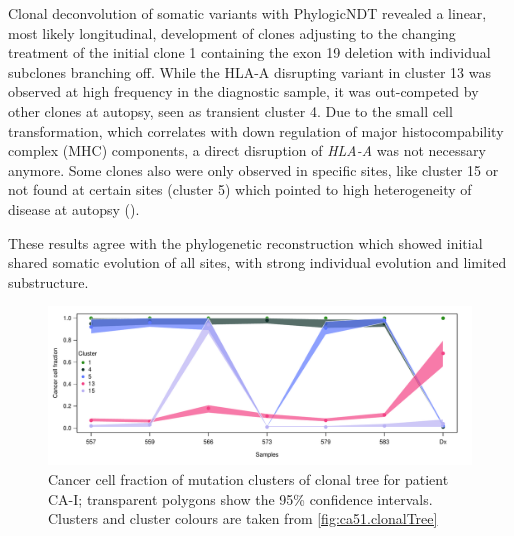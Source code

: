 Clonal deconvolution of somatic variants with PhylogicNDT revealed a linear, most likely longitudinal, development of clones adjusting to the changing treatment of the initial clone 1 containing the exon 19 deletion with individual subclones branching off. While the HLA-A disrupting variant in cluster 13 was observed at high frequency in the diagnostic sample, it was out-competed by other clones at autopsy, seen as transient cluster 4. Due to the small cell transformation, which correlates with down regulation of major histocompability complex (MHC) components, a direct disruption of \textit{HLA-A} was not necessary anymore. Some clones also were only observed in specific sites, like cluster 15 or not found at certain sites (cluster 5) which pointed to high heterogeneity of disease at autopsy ().

These results agree with the phylogenetic reconstruction which showed initial shared somatic evolution of all sites, with strong individual evolution and limited substructure.

\begin{figure}[ht]
\centering
\includegraphics[width=.99\linewidth]{Figures/CASCADE/CA51/CA51.ccf_cluster.pdf}
\caption[Cancer cell fraction of mutation clusters of clonal tree for patient CA-I]{Cancer cell fraction of mutation clusters of clonal tree for patient CA-I; transparent polygons show the 95\% confidence intervals. Clusters and cluster colours are taken from \protect\autoref{fig:ca51.clonalTree}} \label{fig:ca51.ccfCluster}
\end{figure}


\cleardoublepage



